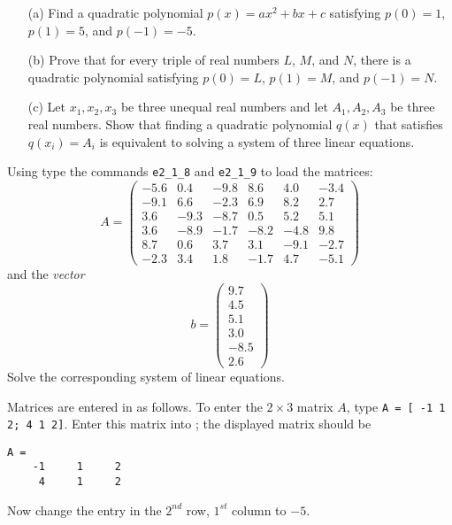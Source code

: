 \begin{exercise} \label{c2.1.11}
\begin{itemize}
\item[(a)] Find a quadratic polynomial $p(x) = ax^2 + bx + c$
satisfying $p(0) = 1$, $p(1) = 5$, and $p(-1) = -5$.
\item[(b)] Prove that for every triple of real numbers $L$, $M$,
and $N$, there is a quadratic polynomial satisfying $p(0) = L$,
$p(1) = M$, and $p(-1) = N$.
\item[(c)] Let $x_1,x_2,x_3$ be three unequal real
numbers and let $A_1,A_2,A_3$ be three real numbers.  Show
that finding a quadratic polynomial $q(x)$ that satisfies
$q(x_i) = A_i$ is equivalent to solving a system of three
linear equations.
\end{itemize}
\end{exercise}

\CEXER

\begin{exercise} \label{c2.1.1}
Using \Matlab type the commands {\tt e2\_1\_8} and {\tt e2\_1\_9}
to load the matrices:
\begin{equation*}
A = \left(
\begin{array}{rrrrrr}
   -5.6 &  0.4 & -9.8 &  8.6 &  4.0 & -3.4\\
   -9.1 &  6.6 & -2.3 &  6.9 &  8.2 &  2.7\\
    3.6 & -9.3 & -8.7 &  0.5 &  5.2 &  5.1\\
    3.6 & -8.9 & -1.7 & -8.2 & -4.8 &  9.8\\
    8.7 &  0.6 &  3.7 &  3.1 & -9.1 & -2.7\\
   -2.3 &  3.4 &  1.8 & -1.7 &  4.7 & -5.1
\end{array}
\right)
\end{equation*}
and the {\em vector\/}
\begin{equation*}
b = \left(
\begin{array}{r}
    9.7\\
    4.5\\
    5.1\\
    3.0\\
   -8.5\\
    2.6
\end{array}
\right)
\end{equation*}
Solve the corresponding system of linear equations.
\end{exercise}

\begin{exercise} \label{c2.1.2}
Matrices are entered in \Matlab as follows. To enter
the $2\times 3$ matrix $A$, type {\tt A = [ -1 1 2; 4 1 2]}.
Enter this matrix into \Matlabp; the displayed matrix should be
\begin{verbatim}
A =
    -1     1     2
     4     1     2
\end{verbatim}
Now change the entry in the $2^{nd}$ row, $1^{st}$ column to
$-5$.
\end{exercise}

